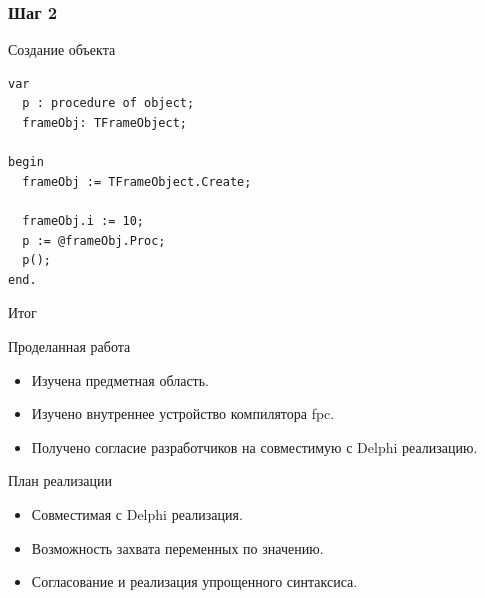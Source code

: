 \documentclass[roman,12pt]{beamer}
\begin{document}
\begin{frame}[fragile]
  \frametitle{Шаг 2}
 \begin{block}{Создание объекта}
   \begin{lstlisting}
var
  p : procedure of object;
  frameObj: TFrameObject;

begin
  frameObj := TFrameObject.Create;

  frameObj.i := 10;
  p := @frameObj.Proc;
  p();
end.
   \end{lstlisting}
 \end{block} 
\end{frame}

\begin{frame}{Итог}
   \begin{block}{Проделанная работа}
     \begin{itemize}
     \item Изучена предметная область.
     \item Изучено внутреннее устройство компилятора fpc.
     \item Получено согласие разработчиков на совместимую с Delphi реализацию.
     \end{itemize}
   \end{block} 
   \begin{block}{План реализации}
     \begin{itemize}
     \item Совместимая с Delphi реализация.
     \item Возможность захвата переменных по значению.
     \item Согласование и реализация упрощенного синтаксиса.
     \end{itemize}
   \end{block} 
\end{frame}
\end{document}
